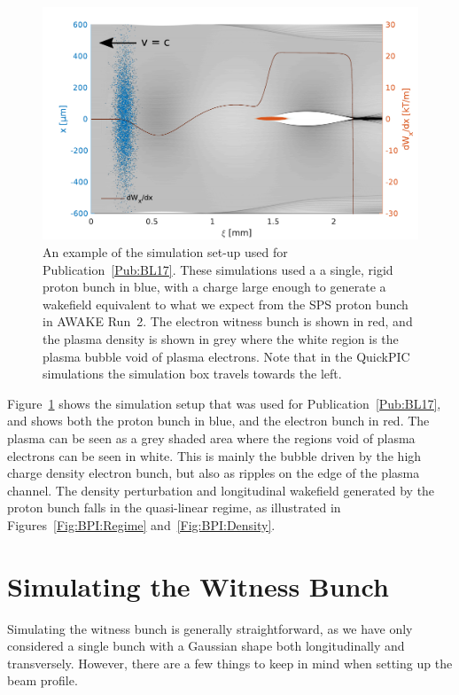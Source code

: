 \begin{figure}[hbt]
    \centering
    \includegraphics[width=0.8125\linewidth,trim={0mm 0mm 0mm 0mm},clip]{figures/SingleBunchPB}
    \caption{\label{Fig:PBSingle}
        An example of the simulation set-up used for Publication~\ref{Pub:BL17}.
        These simulations used a a single, rigid proton bunch in blue, with a charge large enough to generate a wakefield equivalent to what we expect from the SPS proton bunch in AWAKE Run~2.
        The electron witness bunch is shown in red, and the plasma density is shown in grey where the white region is the plasma bubble void of plasma electrons.
        Note that in the QuickPIC simulations the simulation box travels towards the left.
    }
\end{figure}

Figure~\ref{Fig:PBSingle} shows the simulation setup that was used for Publication~\ref{Pub:BL17}, and shows both the proton bunch in blue, and the electron bunch in red.
The plasma can be seen as a grey shaded area where the regions void of plasma electrons can be seen in white.
This is mainly the bubble driven by the high charge density electron bunch, but also as ripples on the edge of the plasma channel.
The density perturbation and longitudinal wakefield generated by the proton bunch falls in the quasi-linear regime, as illustrated in Figures~\ref{Fig:BPI:Regime} and~\ref{Fig:BPI:Density}.

\section{Simulating the Witness Bunch}
\label{Sim:EBeam}

Simulating the witness bunch is generally straightforward, as we have only considered a single bunch with a Gaussian shape both longitudinally and transversely.
However, there are a few things to keep in mind when setting up the beam profile.

